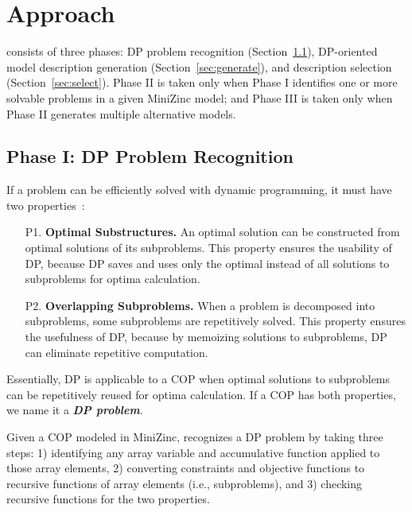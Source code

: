 \section{Approach}
 
 \tool consists of three phases: DP problem recognition (Section~\ref{sec:recognize}), DP-oriented model description generation (Section~\ref{sec:generate}), and description selection (Section~\ref{sec:select}). 
 Phase II is taken only when Phase I identifies one or more solvable problems in a given MiniZinc model; and Phase III is taken only when Phase II generates multiple alternative models. 
 
 \subsection{Phase I: DP Problem Recognition}
 \label{sec:recognize}
If a problem can be efficiently solved with dynamic programming, it must have two  properties~\cite{T2012Introduction}:

\begin{enumerate}
    \item[P1.] \textbf{Optimal Substructures.} An optimal solution can be constructed from optimal solutions of its subproblems. This property ensures the usability of DP, because DP saves and uses only the optimal instead of all solutions to subproblems for optima calculation. 
    
   \item[P2.] \textbf{Overlapping Subproblems.} 
   When a problem is decomposed into subproblems, some  subproblems are repetitively solved. 
   This property ensures the usefulness of DP, because by memoizing solutions to subproblems, DP can eliminate repetitive computation. 
\end{enumerate}
Essentially, DP is applicable to a COP when optimal solutions to subproblems can be repetitively reused for optima calculation.
If a COP has both properties, we name it a 
\textbf{\emph{DP problem}}.  
 
 Given a COP modeled in MiniZinc, \tool recognizes a DP problem by taking three steps: 1) identifying 
 any array variable and accumulative function applied to those array elements, 
 2) converting constraints and objective functions to recursive functions of array elements (i.e., subproblems), and 
 3) checking recursive functions for the two properties. 

